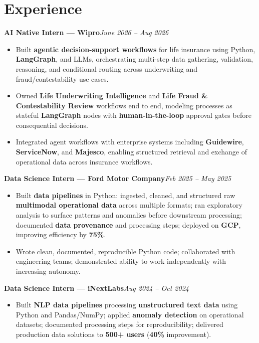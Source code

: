 \documentclass[10pt, letterpaper]{article}
\newcommand{\expentry}[2]{\noindent\textbf{#1}\hfill{\textit{#2}}}
\begin{document}
\section{Experience}
\expentry{AI Native Intern --- Wipro}{June 2026 -- Aug 2026}
\begin{itemize}
\item Built \textbf{agentic decision-support workflows} for life insurance using Python, \textbf{LangGraph}, and LLMs, orchestrating multi-step data gathering, validation, reasoning, and conditional routing across underwriting and fraud/contestability use cases.
\item Owned \textbf{Life Underwriting Intelligence} and \textbf{Life Fraud \& Contestability Review} workflows end to end, modeling processes as stateful \textbf{LangGraph} nodes with \textbf{human-in-the-loop} approval gates before consequential decisions.
\item Integrated agent workflows with enterprise systems including \textbf{Guidewire}, \textbf{ServiceNow}, and \textbf{Majesco}, enabling structured retrieval and exchange of operational data across insurance workflows.
\end{itemize}
\vspace{0.6pt}
\expentry{Data Science Intern --- Ford Motor Company}{Feb 2025 -- May 2025}
\begin{itemize}
\item Built \textbf{data pipelines} in Python: ingested, cleaned, and structured raw \textbf{multimodal operational data} across multiple formats; ran exploratory analysis to surface patterns and anomalies before downstream processing; documented \textbf{data provenance} and processing steps; deployed on \textbf{GCP}, improving efficiency by \textbf{75\%}.
\item Wrote clean, documented, reproducible Python code; collaborated with engineering teams; demonstrated ability to work independently with increasing autonomy.
\end{itemize}
\vspace{0.6pt}
\expentry{Data Science Intern --- iNextLabs}{Aug 2024 -- Oct 2024}
\begin{itemize}
\item Built \textbf{NLP data pipelines} processing \textbf{unstructured text data} using Python and Pandas/NumPy; applied \textbf{anomaly detection} on operational datasets; documented processing steps for reproducibility; delivered production data solutions to \textbf{500+ users} (\textbf{40\%} improvement).
\end{itemize}
\end{document}
